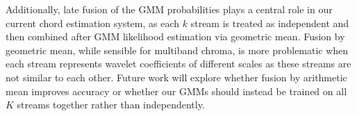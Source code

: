 \documentclass{article}
\begin{document}
Additionally, late fusion of the GMM probabilities plays a central role in our current chord estimation system, as each $k$ stream is treated as independent and then combined after GMM likelihood estimation via geometric mean. Fusion by geometric mean, while sensible for multiband chroma, is more problematic when each stream represents wavelet coefficients of different scales as these streams are not similar to each other. Future work will explore whether fusion by arithmetic mean improves accuracy or whether our GMMs should instead be trained on all $K$ streams together rather than independently. 










%

%
%
%
%
\end{document}
